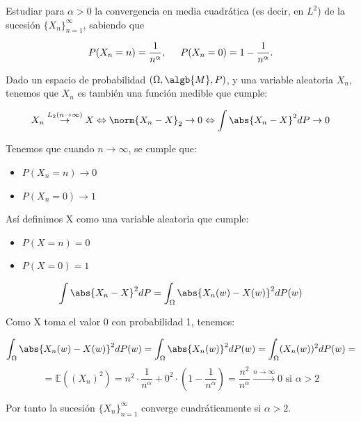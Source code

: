 \begin{problem}[14] Estudiar para $ \alpha>0 $ la convergencia en
media cuadr\'atica (es decir, en $L^2$) de la sucesi\'on $\{X_n\}_{n=1}^\infty$, sabiendo que

\[  P(X_n=n)=\frac{1}{n^\alpha}, \hspace{5mm} P(X_n=0)=1-\frac{1}{n^\alpha}.
  \]
\solution

\begin{expla}
Dado un espacio de probabilidad $(\Omega, \algb{M}, P)$, y una variable aleatoria $X_n$, tenemos que $X_n$ es también una función medible que cumple:

\[
X_n \stackrel{L_2 (n\rightarrow \infty)}{\rightarrow} X \Leftrightarrow \norm{X_n -X}_2  \rightarrow 0 \Leftrightarrow \int{\abs{X_n -X}^2dP} \rightarrow 0
\]

Tenemos que cuando $n \rightarrow \infty$, se cumple que:
\begin{itemize}
\item $P(X_n = n) \rightarrow 0$
\item $P(X_n = 0) \rightarrow 1$
\end{itemize}

Así definimos X como una variable aleatoria que cumple:

\begin{itemize}
\item $P(X = n) = 0$
\item $P(X = 0) = 1$
\end{itemize}

\end{expla}

\[
\int{\abs{X_n -X}^2dP} = \int_{\Omega}{\abs{X_n(w) -X(w)}^2dP(w)}
\]

Como X toma el valor 0 con probabilidad 1, tenemos:

\[
\int_{\Omega}\abs{X_n(w) -X(w)}^2dP(w)=\int_{\Omega}\abs{X_n(w)}^2dP(w)=\int_{\Omega}(X_n(w))^2dP(w) =
\]
\[
=\mathbb{E}((X_n)^2)=n^2\cdot\frac{1}{n^{\alpha}}+0^2\cdot(1-\frac{1}{n^{\alpha}})=\frac{n^2}{n^{\alpha}} \stackrel{n \rightarrow \infty}{\rightarrow} 0 \text{ si } \alpha>2 
\]

Por tanto la sucesión $\{X_n\}_{n=1}^\infty$ converge cuadráticamente si $\alpha > 2$.



\end{problem}






